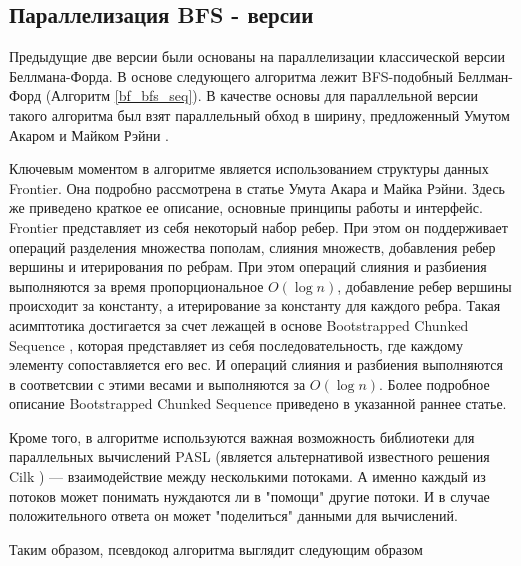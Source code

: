 \FloatBarrier
\subsection{Параллелизация BFS - версии}
Предыдущие две версии были основаны на параллелизации классической версии Беллмана-Форда. В основе следующего алгоритма лежит BFS-подобный Беллман-Форд (Алгоритм \ref{bf_bfs_seq}). В качестве основы для параллельной версии такого алгоритма был взят параллельный обход в ширину, предложенный Умутом Акаром и Майком Рэйни \cite{FRONTIERSEARCH}. 


Ключевым моментом в алгоритме является использованием структуры данных Frontier. Она подробно рассмотрена в статье Умута Акара и Майка Рэйни. Здесь же приведено краткое ее описание, основные принципы работы и интерфейс. Frontier представляет из себя некоторый набор ребер. При этом он поддерживает операций разделения множества пополам, слияния множеств, добавления ребер вершины и итерирования по ребрам. При этом  операций слияния и разбиения выполняются за время пропорциональное $O(\log n)$, добавление ребер вершины происходит за константу, а итерирование за константу для каждого ребра. Такая асимптотика достигается за счет лежащей в основе Bootstrapped Chunked Sequence \cite{CHUNKEDSEQ}, которая представляет из себя последовательность, где каждому элементу сопоставляется его вес. И операций слияния и разбиения выполняются в соответсвии с этими весами и выполняются за $O(\log n)$. Более подробное описание Bootstrapped Chunked Sequence приведено в указанной раннее статье. 

Кроме того, в алгоритме используются важная возможность библиотеки для параллельных вычислений PASL \cite{PASL} (является альтернативой известного решения Cilk \cite{CILK}) --- взаимодействие между несколькими потоками. А именно каждый из потоков может понимать нуждаются ли в "помощи" другие потоки. И в случае положительного ответа он может "поделиться" данными для вычислений. 

Таким образом, псевдокод алгоритма выглядит следующим образом

